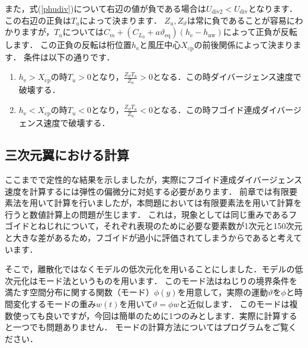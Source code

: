 \documentclass{jarticle}
\begin{document}
また，式(\ref{phudiv})について右辺の値が負である場合は$U_\mathrm{div2} < U_\mathrm{div}$となります．この右辺の正負は$T_u$によって決まります．
$Z_u,Z_\vartheta$は常に負であることが容易にわかりますが，$T_u$については$C_m +  (C_{L_0} + a\vartheta_\mathrm{eq})  (h_\mathrm{e}-h_\mathrm{nw})$によって正負が反転します．
この正負の反転は桁位置$h_\mathrm{e}$と風圧中心$X_\mathrm{cp}$の前後関係によって決まります．
条件は以下の通りです．
\begin{enumerate}
    \item $h_\mathrm{e} > X_\mathrm{cp}$の時$T_u>0$となり，$\frac{Z_\vartheta T_u}{Z_u} > 0$となる．この時ダイバージェンス速度で破壊する．
    \item $h_\mathrm{e} < X_\mathrm{cp}$の時$T_u<0$となり，$\frac{Z_\vartheta T_u}{Z_u} < 0$となる．この時フゴイド連成ダイバージェンス速度で破壊する．
\end{enumerate}

\subsection{三次元翼における計算}

ここまでで定性的な結果を示しましたが，実際にフゴイド連成ダイバージェンス速度を計算するには弾性の偏微分に対処する必要があります．
前章では有限要素法を用いて計算を行いましたが，本問題においては有限要素法を用いて計算を行うと数値計算上の問題が生じます．
これは，現象としては同じ重みであるフゴイドとねじれについて，それぞれ表現のために必要な要素数が1次元と150次元と大きな差があるため，フゴイドが過小に評価されてしまうからであると考えています．

そこで，離散化ではなくモデルの低次元化を用いることにしました．モデルの低次元化はモード法というものを用います．
このモード法はねじりの境界条件を満たす空間分布に関する関数（モード）$\phi(y)$を用意して，実際の運動$\vartheta$を$\phi$と時間変化するモードの重み$w(t)$を用いて$\vartheta=\phi w$と近似します．
このモードは複数使っても良いですが，今回は簡単のために1つのみとします．実際に計算すると一つでも問題ありません．
モードの計算方法についてはプログラムをご覧ください．
\end{document}
